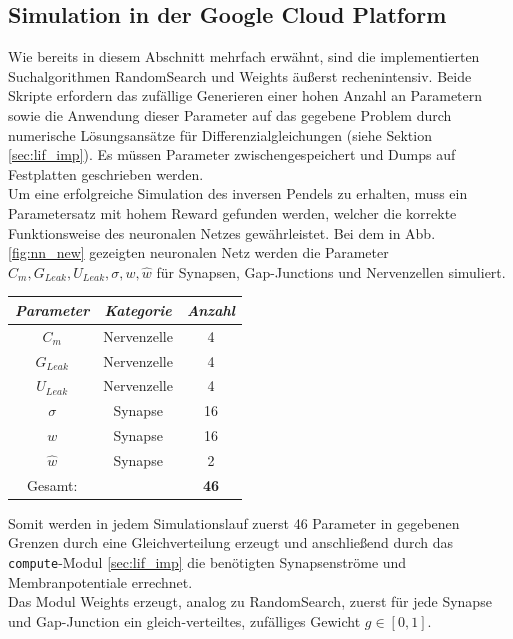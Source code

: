 	\subsection{Simulation in der Google Cloud Platform\textsuperscript{\textregistered}}
		Wie bereits in diesem Abschnitt mehrfach erwähnt, sind die implementierten Suchalgorithmen RandomSearch und Weights äußerst rechenintensiv. Beide Skripte erfordern das zufällige Generieren einer hohen Anzahl an Parametern sowie die Anwendung dieser Parameter auf das gegebene Problem durch numerische Lösungsansätze für Differenzialgleichungen (siehe Sektion \ref{sec:lif_imp}). Es müssen Parameter zwischengespeichert und Dumps auf Festplatten geschrieben werden.\\
		Um eine erfolgreiche Simulation des inversen Pendels zu erhalten, muss ein Parametersatz mit hohem Reward gefunden werden, welcher die korrekte Funktionsweise des neuronalen Netzes gewährleistet. Bei dem in Abb. \ref{fig:nn_new} gezeigten neuronalen Netz werden die Parameter $C_m, G_{Leak}, U_{Leak}, \sigma, w, \hat{w}$ für Synapsen, Gap-Junctions und Nervenzellen simuliert.
		\begin{center}
			\begin{tabular}{c@{\hskip 0.5cm}c@{\hskip 0.5cm}c@{\hskip 0.5cm}}    \toprule
				\setlength{\tabcolsep}{50pt}
				\renewcommand{\arraystretch}{1.5}
				\emph{Parameter}	& \emph{Kategorie}  & \emph{Anzahl} \\\midrule
				$C_m$				& Nervenzelle		& 4				\\ 
				$G_{Leak}$	 		& Nervenzelle		& 4				\\
				$U_{Leak}$	 		& Nervenzelle		& 4				\\
				$\sigma$			& Synapse			& 16			\\
				$w$					& Synapse			& 16			\\ 
				$\hat{w}$			& Synapse			& 2				\\\bottomrule
				Gesamt:				&					& \textbf{46}	\\
				\hline
			\end{tabular}
		\end{center}
		Somit werden in jedem Simulationslauf zuerst 46 Parameter in gegebenen Grenzen durch eine Gleichverteilung erzeugt und anschließend durch das \texttt{compute}-Modul \ref{sec:lif_imp} die benötigten Synapsenströme und Membranpotentiale errechnet.\\
		Das Modul Weights erzeugt, analog zu RandomSearch, zuerst für jede Synapse und Gap-Junction ein gleich-verteiltes, zufälliges Gewicht $g\in[0,1]$.

